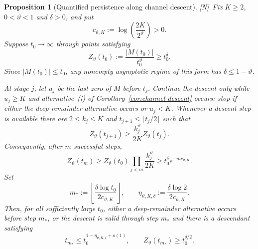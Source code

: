 \documentclass[11pt,reqno]{amsart}
\numberwithin{equation}{section}
\theoremstyle{plain}
\newtheorem{proposition}[theorem]{Proposition}
\theoremstyle{definition}
\theoremstyle{remark}
\newcommand{\tagN}{\textup{[N]}}
\begin{document}
\begin{proposition}[Quantified persistence along channel descent]
\label{prop:quantified-channel-persistence}
\tagN\ Fix $K\ge2$, $0<\vartheta<1$ and $\delta>0$, and put
\begin{equation}
 c_{\vartheta,K}:=\log\!\left(\frac{2K}{2^\vartheta}\right)>0.
\end{equation}
Suppose $t_0\to\infty$ through points satisfying
\begin{equation}
 Z_\vartheta(t_0):=\frac{|M(t_0)|}{t_0^\vartheta}\ge t_0^\delta.
\end{equation}
Since $|M(t_0)|\le t_0$, any nonempty asymptotic regime of this form has
$\delta\le1-\vartheta$.

At stage $j$, let $u_j$ be the last zero of $M$ before $t_j$. Continue the
descent only while $u_j\ge K$ and alternative~\textup{(i)} of
Corollary~\ref{cor:channel-descent} occurs; stop if either the deep-remainder
alternative occurs or $u_j<K$. Whenever a descent step is available there
are $2\le k_j\le K$ and $t_{j+1}\le\lfloor t_j/2\rfloor$ such that
\begin{equation}
 Z_\vartheta(t_{j+1})\ge\frac{k_j^\vartheta}{2K}Z_\vartheta(t_j).
\end{equation}
Consequently, after $m$ successful steps,
\begin{equation}
\label{eq:channel-product-persistence}
 Z_\vartheta(t_m)
 \ge Z_\vartheta(t_0)\prod_{j<m}\frac{k_j^\vartheta}{2K}
 \ge t_0^\delta e^{-m c_{\vartheta,K}}.
\end{equation}
Set
\begin{equation}
 m_*:=\left\lfloor\frac{\delta\log t_0}{2c_{\vartheta,K}}\right\rfloor,
 \qquad
 \eta_{\vartheta,K,\delta}:=
 \frac{\delta\log2}{2c_{\vartheta,K}}.
\end{equation}
Then, for all sufficiently large $t_0$, either a deep-remainder alternative
occurs before step $m_*$, or the descent is valid through step $m_*$ and
there is a descendant satisfying
\begin{equation}
 t_{m_*}\le t_0^{1-\eta_{\vartheta,K,\delta}+o(1)},
 \qquad
 Z_\vartheta(t_{m_*})\ge t_0^{\delta/2}.
\end{equation}
\end{proposition}
\end{document}
